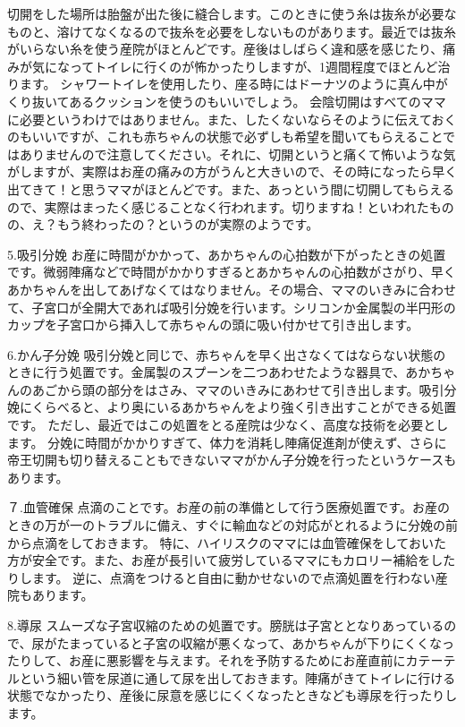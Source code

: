 切開をした場所は胎盤が出た後に縫合します。このときに使う糸は抜糸が必要なものと、溶けてなくなるので抜糸を必要をしないものがあります。最近では抜糸がいらない糸を使う産院がほとんどです。産後はしばらく違和感を感じたり、痛みが気になってトイレに行くのが怖かったりしますが、1週間程度でほとんど治ります。
シャワートイレを使用したり、座る時にはドーナツのように真ん中がくり抜いてあるクッションを使うのもいいでしょう。
会陰切開はすべてのママに必要というわけではありません。また、したくないならそのように伝えておくのもいいですが、これも赤ちゃんの状態で必ずしも希望を聞いてもらえることではありませんので注意してください。それに、切開というと痛くて怖いような気がしますが、実際はお産の痛みの方がうんと大きいので、その時になったら早く出てきて！と思うママがほとんどです。また、あっという間に切開してもらえるので、実際はまったく感じることなく行われます。切りますね！といわれたものの、え？もう終わったの？というのが実際のようです。

5.吸引分娩
お産に時間がかかって、あかちゃんの心拍数が下がったときの処置です。微弱陣痛などで時間がかかりすぎるとあかちゃんの心拍数がさがり、早くあかちゃんを出してあげなくてはなりません。その場合、ママのいきみに合わせて、子宮口が全開大であれば吸引分娩を行います。シリコンか金属製の半円形のカップを子宮口から挿入して赤ちゃんの頭に吸い付かせて引き出します。

6.かん子分娩
吸引分娩と同じで、赤ちゃんを早く出さなくてはならない状態のときに行う処置です。金属製のスプーンを二つあわせたような器具で、あかちゃんのあごから頭の部分をはさみ、ママのいきみにあわせて引き出します。吸引分娩にくらべると、より奥にいるあかちゃんをより強く引き出すことができる処置です。
ただし、最近ではこの処置をとる産院は少なく、高度な技術を必要とします。
分娩に時間がかかりすぎて、体力を消耗し陣痛促進剤が使えず、さらに帝王切開も切り替えることもできないママがかん子分娩を行ったというケースもあります。

７.血管確保
点滴のことです。お産の前の準備として行う医療処置です。お産のときの万が一のトラブルに備え、すぐに輸血などの対応がとれるように分娩の前から点滴をしておきます。
特に、ハイリスクのママには血管確保をしておいた方が安全です。また、お産が長引いて疲労しているママにもカロリー補給をしたりします。
逆に、点滴をつけると自由に動かせないので点滴処置を行わない産院もあります。

8.導尿
スムーズな子宮収縮のための処置です。膀胱は子宮ととなりあっているので、尿がたまっていると子宮の収縮が悪くなって、あかちゃんが下りにくくなったりして、お産に悪影響を与えます。それを予防するためにお産直前にカテーテルという細い管を尿道に通して尿を出しておきます。陣痛がきてトイレに行ける状態でなかったり、産後に尿意を感じにくくなったときなども導尿を行ったりします。

